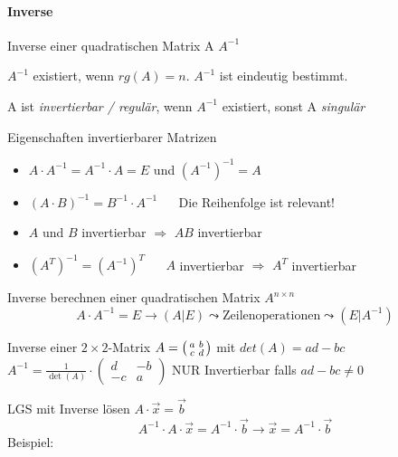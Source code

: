 \paragraph{Inverse}
    \begin{definition}{Inverse einer quadratischen Matrix A} $A^{-1}$ 
        
        $A^{-1}$ existiert, wenn $rg(A) = n$. $A^{-1}$ ist eindeutig bestimmt.

        \vspace{1mm}

        {\small A ist \textit{invertierbar / regulär}, wenn $A^{-1}$ existiert, 
        sonst A \textit{singulär}}
    \end{definition}
  
    \begin{theorem}{Eigenschaften invertierbarer Matrizen}
        \begin{itemize}
            \item $A\cdot A^{-1}=A^{-1}\cdot A=E$ und $(A^{-1})^{-1}=A$
            \item ${(A\cdot B)}^{-1}=B^{-1}\cdot A^{-1}$ {\small $\quad$ Die Reihenfolge ist relevant!}
            \item $A$ und $B$ invertierbar $\Rightarrow$ $AB$ invertierbar
            \item ${(A^T)^{-1}}={(A^{-1})}^T$ $\quad$ $A$ invertierbar $\Rightarrow$ $A^T$ invertierbar
        \end{itemize}
    \end{theorem}

    \begin{KR}{Inverse berechnen} einer quadratischen Matrix $A^{n \times n}$
        $$A \cdot A^{-1} = E \rightarrow \left( A | E \right) \leadsto \text{Zeilenoperationen} \leadsto \left( E | A^{-1}\right)$$
    \end{KR}

\begin{theorem}{Inverse einer $2 \times 2$-Matrix} $A = \begin{psmallmatrix} a & b \\ c & d \end{psmallmatrix}$ mit $det(A) = ad - bc$\\
        $A^{-1} = \frac{1}{\det(A)} \cdot \begin{pmatrix} d & -b \\ -c & a \end{pmatrix}$
        NUR Invertierbar falls $ad - bc \neq 0$
\end{theorem}


\begin{concept}{LGS mit Inverse lösen}
    $A \cdot \vec{x} = \vec{b}$
    $$A^{-1} \cdot A \cdot \vec{x} = A^{-1} \cdot \vec{b} \rightarrow \vec{x} = A^{-1} \cdot \vec{b}$$
    Beispiel:\\
\end{concept}



